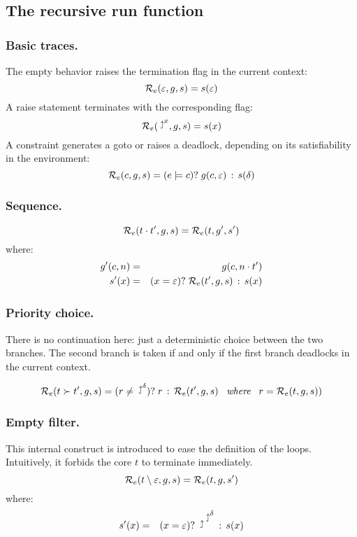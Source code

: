 \subsection{The recursive run function}

\subsubsection{Basic traces.}

The empty behavior raises the termination flag in the current context:
\[
\mbox{${\cal R}_e$}(\varepsilon, g, s) = s(\varepsilon)
\]
A raise statement terminates with the corresponding flag:
\[
\RUNE(\diewith{x}, g, s) = s(x)
\]
A constraint generates a goto or raises a deadlock, depending on its 
satisfiability in the environment:
\[
\mbox{${\cal R}_e$}(c, g, s) = (e\models c)?\;g(c, \varepsilon)\,:\,s(\delta)
\]

\subsubsection{Sequence.}

\[
\mbox{${\cal R}_e$}(t \cdot t', g, s) = \mbox{${\cal R}_e$}(t, g', s')
\]
where:
\begin{eqnarray*}
g'(c,n) & = & g(c, n \cdot t')\\
s'(x) & = & (x = \varepsilon)?\;\mbox{${\cal R}_e$}(t', g, s)\,:\,s(x)
\end{eqnarray*}

\subsubsection{Priority choice.}

There is no continuation here: just a deterministic
choice between the two branches.
The second branch is taken if and only if the first branch deadlocks
in the current context.

\[
\RUNE(t \succ t', g, s) =
	\ITE{r \neq \diewith{\delta}}{r}{\RUNE(t', g, s)}
	\;\;\;\WHERE\;\;\;
   r = \RUNE(t, g, s))
\]

\subsubsection{Empty filter.}
This internal construct is introduced to ease the definition
of the loops. Intuitively, it forbids the core $t$ to terminate 
immediately.
\[
\mbox{${\cal R}_e$}(t\setminus\varepsilon, g, s) = \mbox{${\cal R}_e$}(t, g, s')
\]
where:
\begin{eqnarray*}
s'(x) & = & \ITE{x = \varepsilon}{\diewith{\deadlock}}{s(x)}
\end{eqnarray*}


